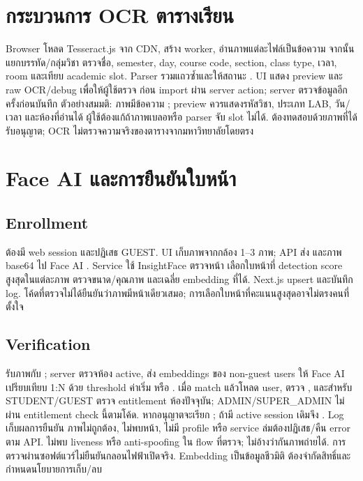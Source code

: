 \chapter{กระบวนการ OCR ตารางเรียน}
Browser โหลด Tesseract.js จาก CDN, สร้าง worker, อ่านภาพแต่ละไฟล์เป็นข้อความ จากนั้น  แยกบรรทัด/กลุ่มวิชา ตรวจชื่อ, semester, day, course code, section, class type, เวลา, room และเทียบ academic slot. Parser รวมแถวซ้ำและให้สถานะ . UI แสดง preview และ raw OCR/debug เพื่อให้ผู้ใช้ตรวจ ก่อน import ผ่าน server action; server ตรวจข้อมูลอีกครั้งก่อนบันทึก
ตัวอย่างสมมติ: ภาพมีข้อความ ; preview ควรแสดงรหัสวิชา, ประเภท LAB, วัน/เวลา และห้องที่อ่านได้ ผู้ใช้ต้องแก้ถ้าภาพเบลอหรือ parser จับ slot ไม่ได้. ต้องทดสอบด้วยภาพที่ได้รับอนุญาต; OCR ไม่ตรวจความจริงของตารางจากมหาวิทยาลัยโดยตรง

\chapter{Face AI และการยืนยันใบหน้า}
\section*{Enrollment}
 ต้องมี web session และปฏิเสธ GUEST. UI เก็บภาพจากกล้อง 1--3 ภาพ; API ส่ง  และภาพ base64 ไป Face AI . Service ใช้ InsightFace ตรวจหน้า เลือกใบหน้าที่ detection score สูงสุดในแต่ละภาพ ตรวจขนาด/คุณภาพ และเฉลี่ย embedding ที่ได้. Next.js upsert  และบันทึก log. โค้ดที่ตรวจไม่ได้ยืนยันว่าภาพมีหน้าเดียวเสมอ; การเลือกใบหน้าที่คะแนนสูงสุดอาจไม่ตรงคนที่ตั้งใจ
\section*{Verification}
 รับภาพกับ ; server ตรวจห้อง active, ส่ง embeddings ของ non-guest users ให้ Face AI เปรียบเทียบ 1:N ด้วย threshold ค่าเริ่ม  หรือ . เมื่อ match แล้วโหลด user, ตรวจ , และสำหรับ STUDENT/GUEST ตรวจ entitlement ห้องปัจจุบัน; ADMIN/SUPER\_ADMIN ไม่ผ่าน entitlement check นี้ตามโค้ด. หากอนุญาตจะเรียก ; ถ้ามี active session เดิมจึง . Log เก็บผลการยืนยัน
ภาพไม่ถูกต้อง, ไม่พบหน้า, ไม่มี profile หรือ service ล่มต้องปฏิเสธ/คืน error ตาม API. ไม่พบ liveness หรือ anti-spoofing ใน flow ที่ตรวจ; ไม่อ้างว่ากันภาพถ่ายได้. การตรวจผ่านซอฟต์แวร์ไม่ยืนยันกลอนไฟฟ้าเปิดจริง. Embedding เป็นข้อมูลชีวมิติ ต้องจำกัดสิทธิ์และกำหนดนโยบายการเก็บ/ลบ

